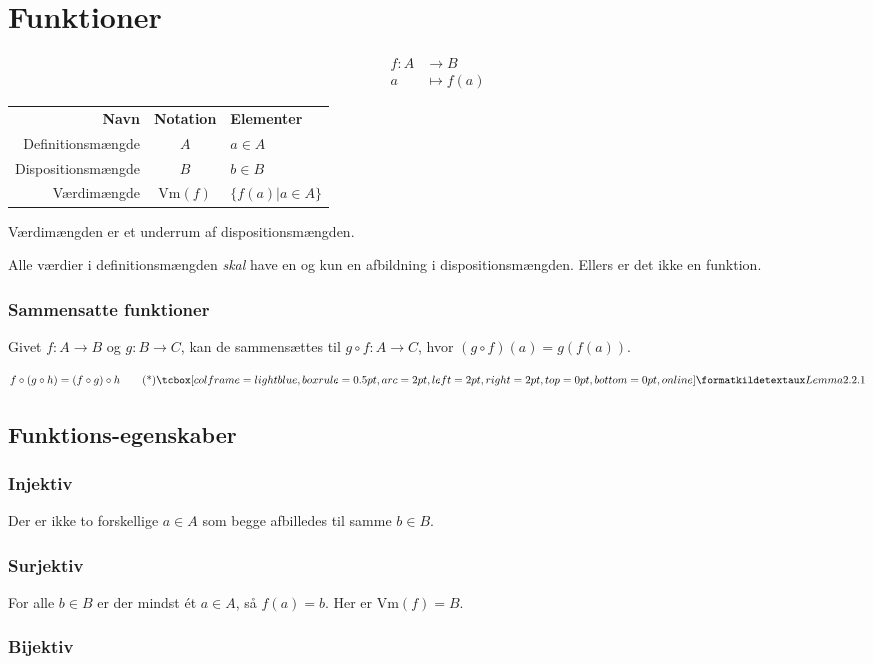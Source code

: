 \section{Funktioner}
\begin{align*}
    f : A &\to B \\
    a &\mapsto f(a)
\end{align*}

\begin{center}
\begin{tabular}{r c l}
    \textbf{Navn} & \textbf{Notation} & \textbf{Elementer} \\
    Definitionsmængde & $A$ & $a \in A$ \\
    Dispositionsmængde & $B$ & $b \in B$ \\
    Værdimængde & $\text{Vm}(f)$ & $\{ f(a) | a \in A \}$
\end{tabular}
\end{center}

Værdimængden er et underrum af dispositionsmængden.

Alle værdier i definitionsmængden \emph{skal} have en og kun en afbildning i dispositionsmængden.
Ellers er det ikke en funktion.

\subsubsection{Sammensatte funktioner}
Givet \(f : A \to B\) og \(g : B \to C\), kan de sammensættes til \(g \circ f : A \to C\), hvor \((g \circ f)(a) = g(f(a))\).

\[f \circ (g \circ h) = (f \circ g) \circ h \kildetag{Lemma 2.2.1}\] 

\subsection{Funktions-egenskaber}
\subsubsection{Injektiv}
Der er ikke to forskellige $a \in A$ som begge afbilledes til samme $b \in B$.

\subsubsection{Surjektiv}
For alle $b \in B$ er der mindst ét $a \in A$, så $f(a) = b$.
Her er $\text{Vm}(f) = B$.

\subsubsection{Bijektiv}

